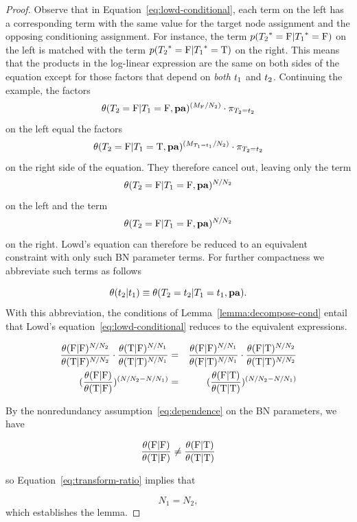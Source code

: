 \documentclass[runningheads,a4paper]{llncs}
\begin{document}
\begin{proof}
Observe that in Equation~\eqref{eq:lowd-conditional}, each term on the left has a corresponding term with the same value for the target node assignment and the opposing conditioning assignment. For instance, the term $p({T_{2}}^{*}\hspace{0.0ex}=\mathrm{F}|{T_{1}}^{*}\hspace{0.0ex}=\mathrm{F})$ on the left is matched with the term $p({T_{2}}^{*}\hspace{0.0ex}=\mathrm{F}|{T_{1}}^{*}\hspace{0.0ex}=\mathrm{T})$ on the right. This means that the products in the log-linear expression are the same on both sides of the equation except for those factors that depend on {\em both} $t_{1}$ and $t_{2}$. Continuing the example, the factors $$\theta(T_{2} = \mathrm{F}|T_{1} = \mathrm{F},\mathbf{pa})^{(M_{\mathrm{F}}/N_{2})} \cdot \pi_{T_2=t_{2}}$$ on the left equal the factors $$\theta(T_{2} = \mathrm{F}|T_{1} = \mathrm{T},\mathbf{pa})^{(M_{T_1=t_{1}}/N_{2})}\cdot \pi_{T_2=t_{2}}$$ on the right side of the equation. They therefore cancel out, leaving only the term $$\theta(T_{2} = \mathrm{F}|T_{1} = \mathrm{F},\mathbf{pa})^{N/N_{2}}$$ on the left and the term $$\theta(T_{2} = \mathrm{F}|T_{1} = \mathrm{F},\mathbf{pa})^{N/N_{2}}$$ on the right. Lowd's equation can therefore be reduced to an equivalent constraint with only such BN parameter terms. For further compactness we abbreviate such terms as follows

$$\theta(t_{2}|t_{1}) \equiv \theta(T_{2} = t_{2}|T_{1} = t_{1},\mathbf{pa}).$$ With this abbreviation, the conditions of Lemma~\ref{lemma:decompose-cond} entail that Lowd's equation~\ref{eq:lowd-conditional} reduces to the equivalent expressions.


\begin{eqnarray}
\frac{\theta(\mathrm{F}|\mathrm{F})^{N/N_{2}}}{\theta(\mathrm{T}|\mathrm{F})^{N/N_{2}} }  \cdot \frac{\theta(\mathrm{T}|\mathrm{F})^{N/N_{1}} }{\theta(\mathrm{T}|\mathrm{T})^{N/N_{1}} }  & = & \frac{\theta(\mathrm{F}|\mathrm{F})^{N/N_{1}} }{\theta(\mathrm{F}|\mathrm{T})^{N/N_{1}} }  \cdot \frac{\theta(\mathrm{F}|\mathrm{T})^{N/N_{2}} }{\theta(\mathrm{T}|\mathrm{T})^{N/N_{2}} } \\
(\frac{\theta(\mathrm{F}|\mathrm{F})}{\theta(\mathrm{T}|\mathrm{F}) })^{\left(N/N_{2}-N/N_{1}\right)}   & = &  (\frac{\theta(\mathrm{F}|\mathrm{T}) }{\theta(\mathrm{T}|\mathrm{T})})^{\left(N/N_{2}-N/N_{1}\right)} \label{eq:transform-ratio}
\end{eqnarray}

By the nonredundancy  assumption~\eqref{eq:dependence} on the BN parameters, we have

$$\frac{\theta(\mathrm{F}|\mathrm{F})}{\theta(\mathrm{T}|\mathrm{F}) }   \neq  \frac{\theta(\mathrm{F}|\mathrm{T}) }{\theta(\mathrm{T}|\mathrm{T})}$$

so Equation~\ref{eq:transform-ratio} implies that 

$$N_{1} = N_{2}, $$ which establishes the lemma. 

\end{proof}
\end{document}
